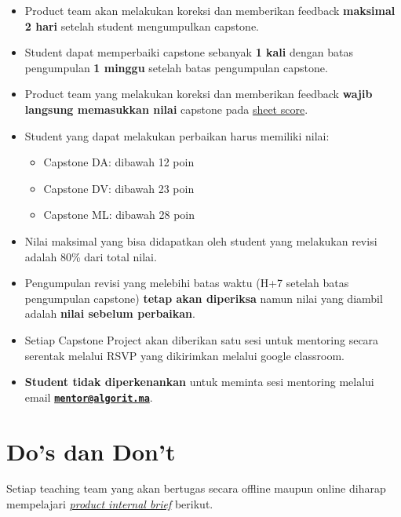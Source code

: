 \documentclass[
]{book}
\providecommand{\tightlist}{%
  \setlength{\itemsep}{0pt}\setlength{\parskip}{0pt}}
\begin{document}
\begin{itemize}
\item
  Product team akan melakukan koreksi dan memberikan feedback \textbf{maksimal 2 hari} setelah student mengumpulkan capstone.
\item
  Student dapat memperbaiki capstone sebanyak \textbf{1 kali} dengan batas pengumpulan \textbf{1 minggu} setelah batas pengumpulan capstone.
\item
  Product team yang melakukan koreksi dan memberikan feedback \textbf{wajib langsung memasukkan nilai} capstone pada \href{https://docs.google.com/spreadsheets/d/1cGJ0pn9k9gKCBnceWVwaL9D7BBDMNjLh8uPYlaBlJi8/edit?usp=sharing}{sheet score}.
\item
  Student yang dapat melakukan perbaikan harus memiliki nilai:

  \begin{itemize}
  \tightlist
  \item
    Capstone DA: dibawah 12 poin
  \item
    Capstone DV: dibawah 23 poin
  \item
    Capstone ML: dibawah 28 poin
  \end{itemize}
\item
  Nilai maksimal yang bisa didapatkan oleh student yang melakukan revisi adalah 80\% dari total nilai.
\item
  Pengumpulan revisi yang melebihi batas waktu (H+7 setelah batas pengumpulan capstone) \textbf{tetap akan diperiksa} namun nilai yang diambil adalah \textbf{nilai sebelum perbaikan}.
\item
  Setiap Capstone Project akan diberikan satu sesi untuk mentoring secara serentak melalui RSVP yang dikirimkan melalui google classroom.
\item
  \textbf{Student tidak diperkenankan} untuk meminta sesi mentoring melalui email \textbf{\href{mailto:mentor@algorit.ma}{\nolinkurl{mentor@algorit.ma}}}.
\end{itemize}

\hypertarget{dos-dan-dont}{%
\chapter{Do's dan Don't}\label{dos-dan-dont}}

Setiap teaching team yang akan bertugas secara offline maupun online diharap mempelajari \href{https://docs.google.com/presentation/d/17f0z3x9RhJCjarY1yY3vWyW23kr-gSHHhTNdtd97BnM/edit?usp=sharing}{\emph{product internal brief}} berikut.
\end{document}
